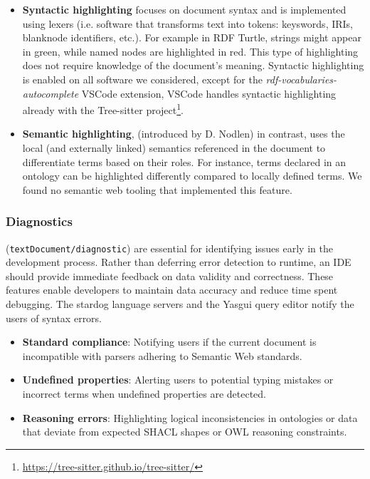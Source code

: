 \begin{itemize}
    \item \textbf{Syntactic highlighting} focuses on document syntax and is implemented using lexers (i.e. software that transforms text into tokens: keyswords, IRIs, blanknode identifiers, etc.).
      For example in RDF Turtle, strings might appear in green, while named nodes are highlighted in red.
      This type of highlighting does not require knowledge of the document's meaning.
      Syntactic highlighting is enabled on all software we considered, except for the 
      \textit{rdf-vocabularies-autocomplete} VSCode extension, VSCode handles syntactic highlighting already with the Tree-sitter project\footnote{\url{https://tree-sitter.github.io/tree-sitter/}}.
    \item \textbf{Semantic highlighting}, (introduced by D. Nodlen\cite{DNolden}) in contrast, uses the local (and externally linked) semantics referenced in the document to differentiate terms based on their roles. 
      For instance, terms declared in an ontology can be highlighted differently compared to locally defined terms.
      We found no semantic web tooling that implemented this feature.
\end{itemize}


\subsubsection{Diagnostics} (\texttt{textDocument/diagnostic}) are essential for identifying issues early in the development process. 
Rather than deferring error detection to runtime, an IDE should provide immediate feedback on data validity and correctness.
These features enable developers to maintain data accuracy and reduce time spent debugging. 
The stardog language servers and the Yasgui query editor notify the users of syntax errors.

\begin{itemize}
    \item \textbf{Standard compliance}: Notifying users if the current document is incompatible with parsers adhering to Semantic Web standards.
    \item \textbf{Undefined properties}: Alerting users to potential typing mistakes or incorrect terms when undefined properties are detected.
    \item \textbf{Reasoning errors}: Highlighting logical inconsistencies in ontologies or data that deviate from expected SHACL shapes or OWL reasoning constraints.
\end{itemize}


